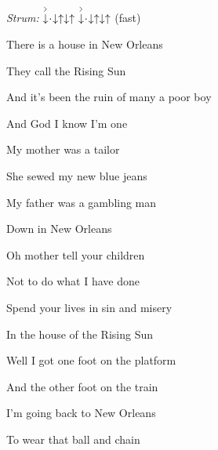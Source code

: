 \begin{song}


 \quad
\textit{Strum:} $\AccentDown\Miss\Down\Up\Down\Up\ \AccentDown\Miss\Down\Up\Down\Up$ (fast)

\large


\Large

\bigskip

    \par
{}    \par

\bigskip

There is a house in New Orleans  \par
They call the Rising Sun  \par
And it’s been the ruin of many a poor boy  \par
And God I know I’m one  \par

\bigskip

My mother was a tailor  \par
She sewed my new blue jeans  \par
My father was a gambling man \par
{}Down in New Orleans  \par

\bigskip

Oh mother  tell your children  \par
Not to do what I have done  \par
{}Spend your lives in sin and misery \par
In the house of the Rising Sun  \par

\bigskip

Well I got one foot  on the platform  \par
And the other foot on the train  \par
I’m going back to New Orleans  \par
To wear that ball and chain  \par


\end{song}
